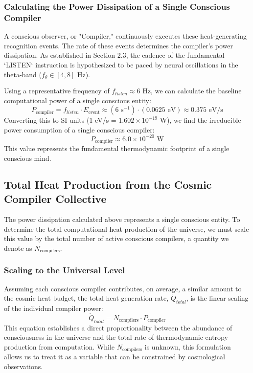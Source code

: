 \documentclass[11pt,a4paper]{article}
\theoremstyle{definition}
\theoremstyle{remark}
\begin{document}
\subsubsection{Calculating the Power Dissipation of a Single Conscious Compiler}

A conscious observer, or "Compiler," continuously executes these heat-generating recognition events. The rate of these events determines the compiler's power dissipation. As established in Section 2.3, the cadence of the fundamental `LISTEN` instruction is hypothesized to be paced by neural oscillations in the theta-band (\(f_{\theta} \in [4, 8]\) Hz).

Using a representative frequency of \(f_{listen} \approx 6\) Hz, we can calculate the baseline computational power of a single conscious entity:
\begin{equation}
    P_{\text{compiler}} = f_{listen} \cdot E_{\text{event}} \approx (6 \text{ s}^{-1}) \cdot (0.0625 \text{ eV}) \approx 0.375 \text{ eV/s}
\end{equation}
Converting this to SI units (1 eV/s = \(1.602 \times 10^{-19}\) W), we find the irreducible power consumption of a single conscious compiler:
\begin{equation}
    P_{\text{compiler}} \approx 6.0 \times 10^{-20} \text{ W}
\end{equation}
This value represents the fundamental thermodynamic footprint of a single conscious mind.

\subsection{Total Heat Production from the Cosmic Compiler Collective}

The power dissipation calculated above represents a single conscious entity. To determine the total computational heat production of the universe, we must scale this value by the total number of active conscious compilers, a quantity we denote as \(N_{\text{compilers}}\).

\subsubsection{Scaling to the Universal Level}
Assuming each conscious compiler contributes, on average, a similar amount to the cosmic heat budget, the total heat generation rate, \(\dot{Q}_{total}\), is the linear scaling of the individual compiler power:
\begin{equation}
    \dot{Q}_{total} = N_{\text{compilers}} \cdot P_{\text{compiler}}
\end{equation}
This equation establishes a direct proportionality between the abundance of consciousness in the universe and the total rate of thermodynamic entropy production from computation. While \(N_{\text{compilers}}\) is unknown, this formulation allows us to treat it as a variable that can be constrained by cosmological observations.
\end{document}
